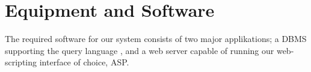\section{Equipment and Software}
\label{sec:equipmentsoftware}

The required software for our system consists of two major applikations; a DBMS supporting the query language \sql[], and a web server capable of running our web-scripting interface of choice, ASP. 